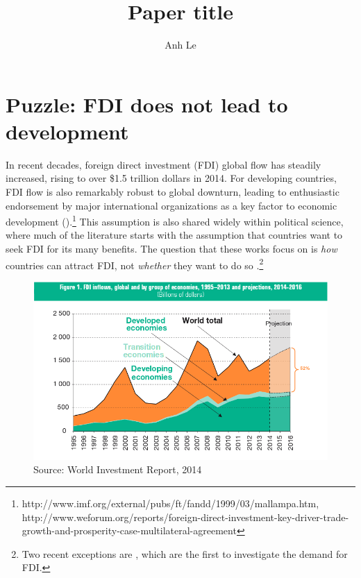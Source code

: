 \documentclass[12pt]{article}
\title{Paper title}
\author{Anh Le}
\begin{document}
\maketitle

\section{Puzzle: FDI does not lead to development}

In recent decades, foreign direct investment (FDI) global flow has steadily increased, rising to over \$1.5 trillion dollars in 2014. For developing countries, FDI flow is also remarkably robust to global downturn, leading to enthusiastic endorsement by major international organizations as a key factor to economic development ().\footnote{http://www.imf.org/external/pubs/ft/fandd/1999/03/mallampa.htm, http://www.weforum.org/reports/foreign-direct-investment-key-driver-trade-growth-and-prosperity-case-multilateral-agreement} This assumption is also shared widely within political science, where much of the literature starts with the assumption that countries want to seek FDI for its many benefits. The question that these works focus on is \textit{how} countries can attract FDI, not \textit{whether} they want to do so \citep{Jensen2003, Li2003, Li2006, Ahlquist2006}.\footnote{Two recent exceptions are \citet{Pinto2013, Pandya2013}, which are the first to investigate the demand for FDI.} 

\begin{figure}[!ht]
\includegraphics[width=\textwidth, height=\textheight,keepaspectratio]{../figure/global_fdi}
\caption{Source: World Investment Report, 2014}
\label{fig:globalfdi}
\end{figure}
\end{document}
